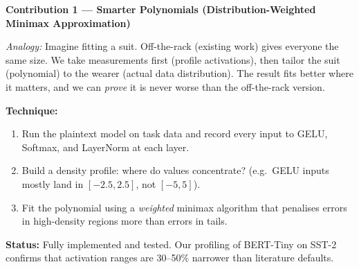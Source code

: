 \documentclass[12pt, a4paper]{article}
\begin{document}
\begin{mdframed}[backgroundcolor=green!5, linecolor=contributiongreen, linewidth=2pt,
  topline=false, rightline=false, bottomline=false,
  innerleftmargin=12pt, innerrightmargin=12pt,
  innertopmargin=10pt, innerbottommargin=10pt]
\textbf{Contribution 1 — Smarter Polynomials (Distribution-Weighted Minimax Approximation)}

\medskip
\textit{Analogy:} Imagine fitting a suit. Off-the-rack (existing work) gives everyone the same size. We take measurements first (profile activations), then tailor the suit (polynomial) to the wearer (actual data distribution). The result fits better where it matters, and we can \emph{prove} it is never worse than the off-the-rack version.

\medskip
\textbf{Technique:}
\begin{enumerate}[leftmargin=1.5em, itemsep=2pt]
  \item Run the plaintext model on task data and record every input to GELU, Softmax, and LayerNorm at each layer.
  \item Build a density profile: where do values concentrate? (e.g.\ GELU inputs mostly land in $[-2.5, 2.5]$, not $[-5, 5]$).
  \item Fit the polynomial using a \emph{weighted} minimax algorithm that penalises errors in high-density regions more than errors in tails.
\end{enumerate}

\medskip
\textbf{Status:} Fully implemented and tested. Our profiling of BERT-Tiny on SST-2 confirms that activation ranges are 30--50\% narrower than literature defaults.
\end{mdframed}

\vspace{0.8em}
\end{document}
